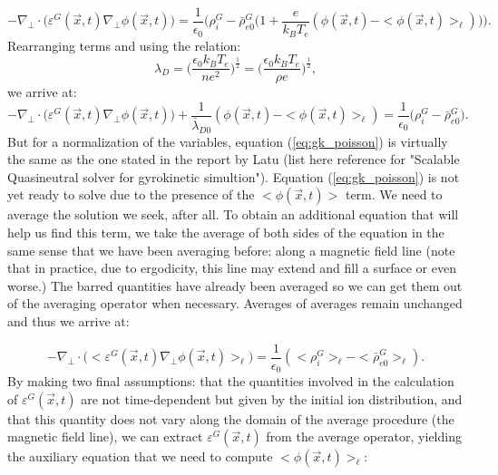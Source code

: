 \documentclass[]{report}   %
\begin{document}
\begin{equation}
- \nabla_{\perp} \cdot \big(\varepsilon ^G(\vec{x},t)\nabla_{\perp} \phi(\vec{x},t) \big) = \frac{1}{\epsilon_0}\bigg(\rho^G_i - \bar{\rho}_{e0}^G\Big(1+\frac{e}{k_BT_e}(\phi(\vec{x},t) - <\phi(\vec{x},t)>_{\ell})\Big)\bigg).
\end{equation}
Rearranging terms and using the relation:
\begin{equation} \label{eq:debye_length}
\lambda_D=\bigg(\frac{\epsilon_0k_BT_e}{ne^2}\bigg)^\frac{1}{2}=\bigg(\frac{\epsilon_0k_BT_e}{\rho e}\bigg)^\frac{1}{2},
\end{equation}
we arrive at:
\begin{equation} \label{eq:gk_poisson}
- \nabla_{\perp} \cdot \big(\varepsilon ^G(\vec{x},t)\nabla_{\perp} \phi(\vec{x},t) \big)+\frac{1}{\bar{\lambda}_{D0}} (\phi(\vec{x},t) - <\phi(\vec{x},t)>_{\ell})= \frac{1}{\epsilon_0}\Big(\rho^G_i - \bar{\rho}_{e0}^G\Big).
\end{equation}
But for a normalization of the variables, equation (\ref{eq:gk_poisson}) is virtually the same as the one stated in the report by Latu (list here reference for "Scalable Quasineutral solver for gyrokinetic simultion"). Equation (\ref{eq:gk_poisson}) is not yet ready to solve due to the presence of the $<\phi(\vec{x},t)>$ term. We need to average the solution we seek, after all. To obtain an additional equation that will help us find this term, we take the average of both sides of the equation in the same sense that we have been averaging before: along a magnetic field line (note that in practice, due to ergodicity, this line may extend and fill a surface or even worse.) The barred quantities have already been averaged so we can get them out of the averaging operator when necessary. Averages of averages remain unchanged and thus we arrive at:

\begin{equation} \label{eq:gk_poisson_aux}
- \nabla_{\perp} \cdot \big(<\varepsilon ^G(\vec{x},t)\nabla_{\perp} \phi(\vec{x},t)>_{\ell} \big)= \frac{1}{\epsilon_0}(<\rho^G_i>_{\ell} - <\bar{\rho}_{e0}^G>_{\ell}).
\end{equation}
By making two final assumptions: that the quantities involved in the calculation of $\varepsilon^G(\vec{x},t)$ are not time-dependent but given by the initial ion distribution, and that this quantity does not vary along the domain of the average procedure (the magnetic field line), we can extract $\varepsilon^G(\vec{x},t)$ from the average operator, yielding the auxiliary equation that we need to compute $<\phi(\vec{x},t)>_{\ell}$:
\end{document}
